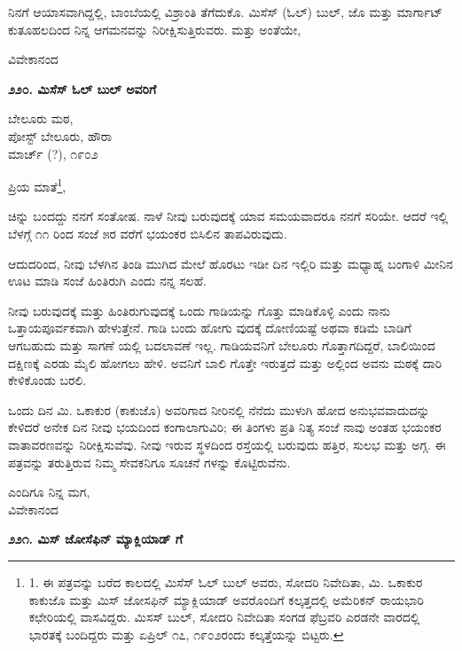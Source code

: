 ನಿನಗೆ ಆಯಾಸವಾಗಿದ್ದಲ್ಲಿ, ಬಾಂಬೆಯಲ್ಲಿ ವಿಶ್ರಾಂತಿ ತೆಗೆದುಕೊ. ಮಿಸೆಸ್ (ಓಲ್) ಬುಲ್, ಜೊ ಮತ್ತು ಮಾರ್ಗಾಟ್ ಕುತೂಹಲದಿಂದ ನಿನ್ನ ಆಗಮನವನ್ನು ನಿರೀಕ್ಷಿಸುತ್ತಿರುವರು. ಮತ್ತು ಅಂತೆಯೇ,

\begin{flushright}
ವಿವೇಕಾನಂದ
\end{flushright}

\begin{center}
\textbf{೨೨೦. ಮಿಸೆಸ್ ಓಲ್ ಬುಲ್ ಅವರಿಗೆ}
\end{center}

\begin{flushright}
ಬೇಲೂರು ಮಠ,\\ಪೋಸ್ಟ್ ಬೇಲೂರು, ಹೌರಾ\\ಮಾರ್ಚ್ (?), ೧೯೦೨
\end{flushright}

ಪ್ರಿಯ ಮಾತೆ\footnote{1. ಈ ಪತ್ರವನ್ನು ಬರೆದ ಕಾಲದಲ್ಲಿ ಮಿಸೆಸ್ ಓಲ್ ಬುಲ್ ಅವರು, ಸೋದರಿ ನಿವೇದಿತಾ, ಮಿ. ಒಕಾಕುರ ಕಾಕುಜೊ ಮತ್ತು ಮಿಸ್ ಜೋಸಫಿನ್ ಮ್ಯಾಕ್ಲಿಯಾಡ್ ಅವರೊಂದಿಗೆ ಕಲ್ಕತ್ತದಲ್ಲಿ ಅಮೆರಿಕನ್ ರಾಯಭಾರಿ ಕಛೇರಿಯಲ್ಲಿ ವಾಸವಿದ್ದರು. ಮಿಸಸ್ ಬುಲ್, ಸೋದರಿ ನಿವೇದಿತಾ ಸಂಗಡ ಫೆಬ್ರವರಿ ಎರಡನೇ ವಾರದಲ್ಲಿ ಭಾರತಕ್ಕೆ ಬಂದಿದ್ದರು ಮತ್ತು ಏಪ್ರಿಲ್ ೧೭, ೧೯೦೨ರಂದು ಕಲ್ಕತ್ತೆಯನ್ನು ಬಿಟ್ಟರು.},

ಚಿನ್ನು ಬಂದದ್ದು ನನಗೆ ಸಂತೋಷ. ನಾಳೆ ನೀವು ಬರುವುದಕ್ಕೆ ಯಾವ ಸಮಯವಾದರೂ ನನಗೆ ಸರಿಯೇ. ಆದರೆ ಇಲ್ಲಿ ಬೆಳಗ್ಗೆ ೧೧ ರಿಂದ ಸಂಜೆ ೫ರ ವರೆಗೆ ಭಯಂಕರ ಬಿಸಿಲಿನ ತಾಪವಿರುವುದು.

ಆದುದರಿಂದ, ನೀವು ಬೆಳಗಿನ ತಿಂಡಿ ಮುಗಿದ ಮೇಲೆ ಹೊರಟು ಇಡೀ ದಿನ ಇಲ್ಲಿರಿ ಮತ್ತು ಮಧ್ಯಾಹ್ನ ಬಂಗಾಳಿ ಮೀನಿನ ಊಟ ಮಾಡಿ ಸಂಜೆ ಹಿಂತಿರುಗಿ ಎಂದು ನನ್ನ ಸಲಹೆ.

ನೀವು ಬರುವುದಕ್ಕೆ ಮತ್ತು ಹಿಂತಿರುಗುವುದಕ್ಕೆ ಒಂದು ಗಾಡಿಯನ್ನು ಗೊತ್ತು ಮಾಡಿಕೊಳ್ಳಿ ಎಂದು ನಾನು ಒತ್ತಾಯಪೂರ್ವಕವಾಗಿ ಹೇಳುತ್ತೇನೆ. ಗಾಡಿ ಬಂದು ಹೋಗು ವುದಕ್ಕೆ ದೋಣಿಯಷ್ಟೆ ಅಥವಾ ಕಡಿಮೆ ಬಾಡಿಗೆ ಆಗಬಹುದು ಮತ್ತು ಸಾಗಣೆ ಯಲ್ಲಿ ಬದಲಾವಣೆ ಇಲ್ಲ. ಗಾಡಿಯವನಿಗೆ ಬೇಲೂರು ಗೊತ್ತಾಗದಿದ್ದರೆ, ಬಾಲಿಯಿಂದ ದಕ್ಷಿಣಕ್ಕೆ ಎರಡು ಮೈಲಿ ಹೋಗಲು ಹೇಳಿ. ಅವನಿಗೆ ಬಾಲಿ ಗೊತ್ತೇ ಇರುತ್ತದೆ ಮತ್ತು ಅಲ್ಲಿಂದ ಅವನು ಮಠಕ್ಕೆ ದಾರಿ ಕೇಳಿಕೊಂಡು ಬರಲಿ.

ಒಂದು ದಿನ ಮಿ. ಒಕಾಕುರ (ಕಾಕುಜೊ) ಅವರಿಗಾದ ನೀರಿನಲ್ಲಿ ನೆನೆದು ಮುಳುಗಿ ಹೋದ ಅನುಭವವಾದುದನ್ನು ಕೇಳಿದರೆ ಅನೇಕ ದಿನ ನೀವು ಭಯದಿಂದ ಕಂಗಾಲಾಗುವಿರಿ; ಈ ತಿಂಗಳು ಪ್ರತಿ ನಿತ್ಯ ಸಂಜೆ ನಾವು ಅಂತಹ ಭಯಂಕರ ವಾತಾವರಣವನ್ನು ನಿರೀಕ್ಷಿಸುವೆವು. ನೀವು ಇರುವ ಸ್ಥಳದಿಂದ ರಸ್ತೆಯಲ್ಲಿ ಬರುವುದು ಹತ್ತಿರ, ಸುಲಭ ಮತ್ತು ಅಗ್ಗ. ಈ ಪತ್ರವನ್ನು ತರುತ್ತಿರುವ ನಿಮ್ಮ ಸೇವಕನಿಗೂ ಸೂಚನೆ ಗಳನ್ನು ಕೊಟ್ಟಿರುವೆನು.

\begin{flushright}
ಎಂದಿಗೂ ನಿನ್ನ ಮಗ,\\ವಿವೇಕಾನಂದ
\end{flushright}

\begin{center}
\textbf{೨೨೧. ಮಿಸ್ ಜೋಸೆಫಿನ್ ಮ್ಯಾಕ್ಲಿಯಾಡ್ ಗೆ}
\end{center}


